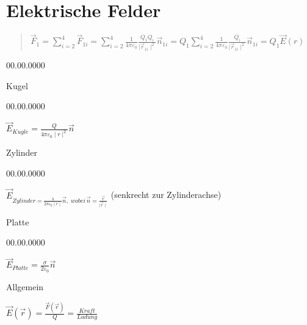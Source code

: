 
\section*{Elektrische Felder}
\begin{verse}
$\vec{F}_{1}=\sum_{i=2}^{4}\vec{F}_{1i}=\sum_{i=2}^{4}\frac{1}{4\pi\varepsilon_{0}}\frac{Q_{1}Q_{i}}{\mid\vec{r}_{1i}\mid^{2}}\vec{n}_{1i}=Q_{1}\sum_{i=2}^{4}\frac{1}{4\pi\varepsilon_{0}}\frac{Q_{i}}{\mid\vec{r}_{1i}\mid^{2}}\vec{n}_{1i}=Q_{1}\vec{E}(r)$\end{verse}
\begin{lyxlist}{00.00.0000}
\item [{Kugel}]~

\begin{lyxlist}{00.00.0000}
\item [{$\vec{E}_{Kugle}=\frac{Q}{4\pi\varepsilon_{0}\mid r\mid^{2}}\vec{n}$}]~
\end{lyxlist}
\item [{Zylinder}]~

\begin{lyxlist}{00.00.0000}
\item [{$\vec{E}_{Zylinder=\frac{\lambda}{2\pi\varepsilon_{0}\mid r\mid}\vec{n},\; wobei\,\vec{n}=\frac{\vec{r}}{\mid\vec{r}\mid}}$}] (senkrecht
zur Zylinderachse)
\end{lyxlist}
\item [{Platte}]~

\begin{lyxlist}{00.00.0000}
\item [{$\vec{E}_{Platte}=\frac{\sigma}{2\varepsilon_{0}}\vec{n}$}]~
\end{lyxlist}
\end{lyxlist}
Allgemein

$\vec{E}(\vec{r})=\frac{\vec{F}(\vec{r})}{Q}=\frac{Kraft}{Ladung}$
